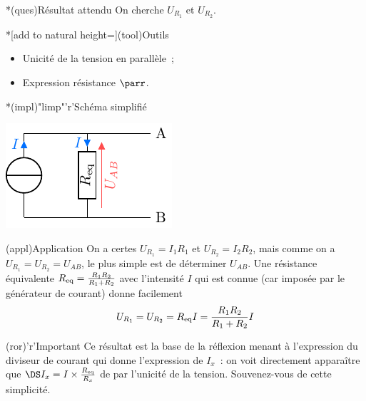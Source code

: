 \documentclass[../../main/main.tex]{subfiles}
\begin{document}
{\begin{tcbraster}[raster columns=3, raster equal height=rows]
\begin{tcb}
\begin{center}
        \end{center}
    \end{tcb}
    \begin{tcolorbox}[blankest, raster multicolumn=1, space to=\myspace]
        \begin{tcbraster}[raster columns=1]
            \begin{tcb}*(ques){Résultat attendu}
                On cherche $U_{R_1}$ et $U_{R_2}$.
            \end{tcb}
            \begin{tcb}*[add to natural height=\myspace](tool){Outils}
                \begin{itemize}
                    \item Unicité de la tension en parallèle~;
                    \item Expression résistance $\parr$.
                \end{itemize}
            \end{tcb}
        \end{tcbraster}
    \end{tcolorbox}
    \begin{tcb}*(impl)"limp"'r'{Schéma simplifié}
        \begin{center}
            \includegraphics{divcour-simple}
        \end{center}
    \end{tcb}
\end{tcbraster}
\begin{tcbraster}[raster columns=2, raster equal height=rows]
    \begin{tcb}(appl){Application}
        On a certes $U_{R_1} = I_1R_1$ et $U_{R_2} = I_2R_2$, mais comme on a
        $U_{R_1} = U_{R_2} = U_{AB}$, le plus simple est de déterminer $U_{AB}$.
        Une résistance équivalente $R_{\rm eq} = \frac{R_1R_2}{R_1+R_2}$ avec
        l'intensité $I$ qui est connue (car imposée par le générateur de
        courant) donne facilement \[U_{R_1} = U_{R_2} = R_{\rm eq}I =
        \frac{R_1R_2}{R_1+R_2}I\]
    \end{tcb}
    \begin{tcb}(ror)'r'{Important}
        Ce résultat est la base de la réflexion menant à l'expression du
        diviseur de courant qui donne l'expression de $I_x$~: on voit
        directement apparaître que $\DS I_x = I\times\frac{R_{\rm eq}}{R_x}$ de par
        l'unicité de la tension. Souvenez-vous de cette simplicité.
    \end{tcb}
\end{tcbraster}

}
\end{document}
